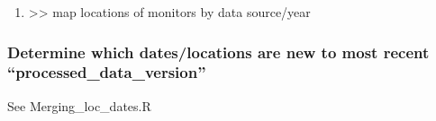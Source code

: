 \begin{enumerate}[nolistsep]
\item {} >> map locations of monitors by data source/year




\end{enumerate}

\subsubsection{Determine which dates/locations are new to most recent ``processed\_data\_version'' }

See Merging\_loc\_dates.R


